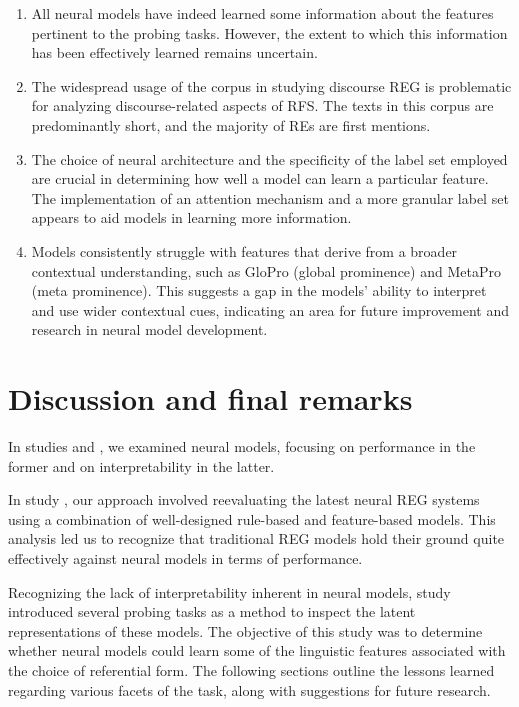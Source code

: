\begin{enumerate}
	\item All neural models have indeed learned some information about the features pertinent to the probing tasks. However, the extent to which this information has been effectively learned remains uncertain.
	\item The widespread usage of the \webnlg corpus in studying discourse REG is problematic for analyzing discourse-related aspects of RFS. The texts in this corpus are predominantly short, and the majority of REs are first mentions.
	\item The choice of neural architecture and the specificity of the label set employed are crucial in determining how well a model can learn a particular feature. The implementation of an attention mechanism and a more granular label set appears to aid models in learning more information.
	\item Models consistently struggle with features that derive from a broader contextual understanding, such as GloPro (global prominence) and MetaPro (meta prominence). This suggests a gap in the models' ability to interpret and use wider contextual cues, indicating an area for future improvement and research in neural model development.
\end{enumerate}


\section{Discussion and final remarks}\label{sec:conclusion}

In studies \studF and \studG, we examined neural models, focusing on performance in the former and on interpretability in the latter.

In study \studF, our approach involved reevaluating the latest neural REG systems using a combination of well-designed rule-based and feature-based models. This analysis led us to recognize that traditional REG models hold their ground quite effectively against neural models in terms of performance. 

Recognizing the lack of interpretability inherent in neural models, study \studG introduced several probing tasks as a method to inspect the latent representations of these models. The objective of this study was to determine whether neural \context models could learn some of the linguistic features associated with the choice of referential form. The following sections outline the lessons learned regarding various facets of the \context task, along with suggestions for future research.

